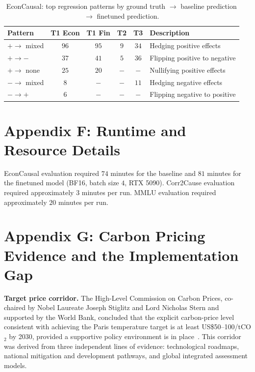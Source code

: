 \documentclass{article}
\begin{document}
\begin{table}[t]
\caption{EconCausal: top regression patterns by ground truth $\rightarrow$ baseline prediction $\rightarrow$ finetuned prediction.}
\label{tab:econcausal_patterns}
\begin{center}
\begin{tabular}{lccccl}
\toprule
Pattern & T1 Econ & T1 Fin & T2 & T3 & Description \\
\midrule
$+ \rightarrow$ mixed & $96$ & $95$ & $9$ & $34$ & Hedging positive effects \\
$+ \rightarrow -$ & $37$ & $41$ & $5$ & $36$ & Flipping positive to negative \\
$+ \rightarrow$ none & $25$ & $20$ & $-$ & $-$ & Nullifying positive effects \\
$- \rightarrow$ mixed & $8$ & $-$ & $-$ & $11$ & Hedging negative effects \\
$- \rightarrow +$ & $6$ & $-$ & $-$ & $-$ & Flipping negative to positive \\
\bottomrule
\end{tabular}
\end{center}
\end{table}

\section{Appendix F: Runtime and Resource Details}

EconCausal evaluation required $74$ minutes for the baseline and $81$ minutes for the finetuned model (BF16, batch size $4$, RTX 5090). Corr2Cause evaluation required approximately $3$ minutes per run. MMLU evaluation required approximately $20$ minutes per run.

\section{Appendix G: Carbon Pricing Evidence and the Implementation Gap}

\textbf{Target price corridor.} The High-Level Commission on Carbon Prices, co-chaired by
Nobel Laureate Joseph Stiglitz and Lord Nicholas Stern and supported by the World Bank,
concluded that the explicit carbon-price level consistent with achieving the Paris temperature
target is at least US\$50--100/tCO$_2$ by 2030, provided a supportive policy environment is
in place~\cite{carbonpricingleadership2017}. This corridor was derived from three independent
lines of evidence: technological roadmaps, national mitigation and development pathways, and
global integrated assessment models.
\end{document}
